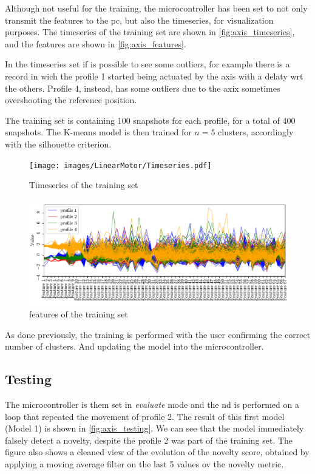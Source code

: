 Although not useful for the training, the microcontroller has been set to not only transmit the features to the \gls{pc}, but also the timeseries, for visualization purposes. The timeseries of the training set are shown in \autoref{fig:axis_timeseries}, and the features are shown in \autoref{fig:axis_features}.

In the timeseries set if is possible to see some outliers, for example there is a record in wich the profile 1 started being actuated by the axis with a delaty \gls{wrt} the others. Profile 4, instead, has some outliers due to the axix sometimes overshooting the reference position.

The training set is containing 100 snapshots for each profile, for a total of 400 snapshots. The K-means model is then trained for $n=5$ clusters, accordingly with the silhouette criterion.

\begin{figure}
    \centering
    \texttt{[image: images/LinearMotor/Timeseries.pdf]}
    \caption{Timeseries of the training set}
    \label{fig:axis_timeseries}
\end{figure}


\begin{figure}
    \centering
    \includegraphics[width=\textwidth]{images/LinearMotor/Features.pdf}
    \caption{features of the training set}
    \label{fig:axis_features}
\end{figure}

As done previously, the training is performed with the user confirming the correct number of clusters. And updating the model into the microcontroller.

\subsection{Testing}
The microcontroller is them set in \emph{evaluate} mode and the \gls{nd} is performed on a loop that repeated the movement of profile 2. The result of this first model (Model 1) is shown in \autoref{fig:axis_testing}. We can see that the model immediately falsely detect a novelty, despite the profile 2 was part of the training set. The figure also shows a cleaned view of the evolution of the novelty score, obtained by applying a moving average filter on the last 5 values ov the novelty metric.

